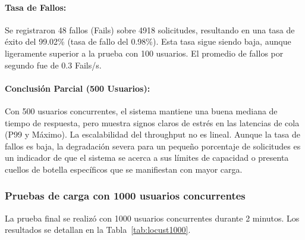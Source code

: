 \paragraph{Tasa de Fallos:}
Se registraron 48 fallos (Fails) sobre 4918 solicitudes, resultando en una tasa de éxito del 99.02\% (tasa de fallo del 0.98\%). Esta tasa sigue siendo baja, aunque ligeramente superior a la prueba con 100 usuarios. El promedio de fallos por segundo fue de 0.3 Fails/s.

\paragraph{Conclusión Parcial (500 Usuarios):}
Con 500 usuarios concurrentes, el sistema mantiene una buena mediana de tiempo de respuesta, pero muestra signos claros de estrés en las latencias de cola (P99 y Máximo). La escalabilidad del throughput no es lineal. Aunque la tasa de fallos es baja, la degradación severa para un pequeño porcentaje de solicitudes es un indicador de que el sistema se acerca a sus límites de capacidad o presenta cuellos de botella específicos que se manifiestan con mayor carga.

\subsubsection{Pruebas de carga con 1000 usuarios concurrentes}

La prueba final se realizó con 1000 usuarios concurrentes durante 2 minutos. Los resultados se detallan en la Tabla~\ref{tab:locust1000}.

\begin{table}[H]
\centering
{}
\caption{Resultados de la prueba de carga con 1000 usuarios concurrentes.}
\label{tab:locust1000}
\end{table}

